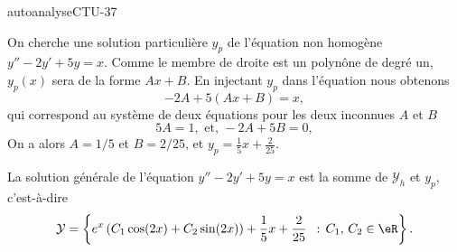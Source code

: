 \begin{corrige}{autoanalyseCTU-37}
\begin{enumerate}
\begin{enumerate}
On cherche une solution particulière $y_p$ de l'équation non homogène $y''-2y'+5y=x$. Comme le membre de droite est un polyn\^one de degré un, $y_p(x)$ sera  de la forme $Ax + B$. En injectant $y_p$ dans l'équation nous obtenons 
\begin{equation*}
  -2A + 5\left(Ax+B\right) = x,
\end{equation*}
qui correspond au système de deux équations pour les deux inconnues $A$ et $B$
\begin{equation*}
    5A =1 ,\text{ et, }-2A +5B = 0,
\end{equation*}
On a alors $A=1/5$ et $B=2/25$, et $y_p = \displaystyle \frac{1}{5}x +\frac{2}{25}$.

La solution générale de l'équation  $y''-2y'+5y=x$ est la somme de $\mathcal{Y}_h$ et $y_p$, c'est-à-dire 
\begin{equation*}
  \mathcal{Y} = \left\{ e^{x}\left(C_1\cos(2x) +C_2\sin(2x)\right)+ \frac{1}{5}x +\frac{2}{25} \ \,:\, C_1,\, C_2 \in \eR \right\}.
\end{equation*}


\end{enumerate}
\end{enumerate}
\end{corrige}
